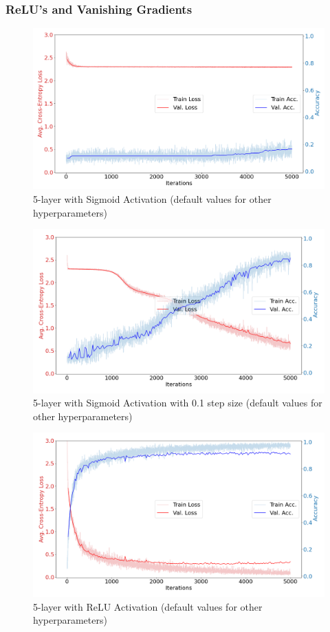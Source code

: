 \documentclass{article}
\begin{document}
\subsubsection*{ReLU's and Vanishing Gradients}
\begin{figure}[H]
    \includegraphics[scale = 0.4]{5layersigmoid.png} 
    \caption{5-layer with Sigmoid Activation (default values for other hyperparameters)}
\end{figure}
\begin{figure}[H]
    \includegraphics[scale = 0.4]{layers5step.1.png} 
    \caption{5-layer with Sigmoid Activation with 0.1 step size (default values for other hyperparameters)}
\end{figure}
\begin{figure}[H]
    \includegraphics[scale = 0.4]{layers5relu.png} 
    \caption{5-layer with ReLU Activation (default values for other hyperparameters)}
\end{figure}
\end{document}
